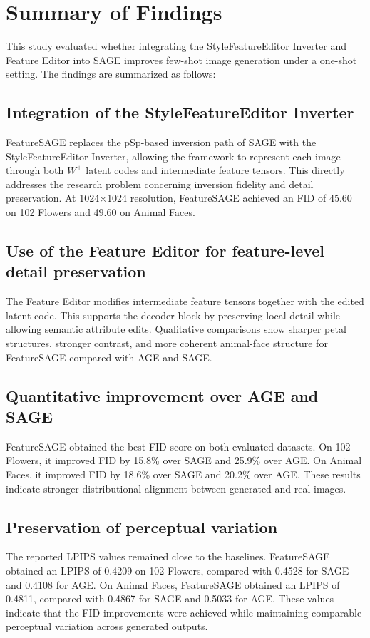 \section{Summary of Findings}

This study evaluated whether integrating the StyleFeatureEditor Inverter and Feature Editor into SAGE improves few-shot image generation under a one-shot setting. The findings are summarized as follows:

\subsection{Integration of the StyleFeatureEditor Inverter}

FeatureSAGE replaces the pSp-based inversion path of SAGE with the StyleFeatureEditor Inverter, allowing the framework to represent each image through both $W^{+}$ latent codes and intermediate feature tensors. This directly addresses the research problem concerning inversion fidelity and detail preservation. At 1024$\times$1024 resolution, FeatureSAGE achieved an FID of 45.60 on 102 Flowers and 49.60 on Animal Faces.

\subsection[Feature Editor for detail preservation]{Use of the Feature Editor for feature-level detail preservation}

The Feature Editor modifies intermediate feature tensors together with the edited latent code. This supports the decoder block by preserving local detail while allowing semantic attribute edits. Qualitative comparisons show sharper petal structures, stronger contrast, and more coherent animal-face structure for FeatureSAGE compared with AGE and SAGE.

\subsection{Quantitative improvement over AGE and SAGE}

FeatureSAGE obtained the best FID score on both evaluated datasets. On 102 Flowers, it improved FID by 15.8\% over SAGE and 25.9\% over AGE. On Animal Faces, it improved FID by 18.6\% over SAGE and 20.2\% over AGE. These results indicate stronger distributional alignment between generated and real images.

\subsection{Preservation of perceptual variation}

The reported LPIPS values remained close to the baselines. FeatureSAGE obtained an LPIPS of 0.4209 on 102 Flowers, compared with 0.4528 for SAGE and 0.4108 for AGE. On Animal Faces, FeatureSAGE obtained an LPIPS of 0.4811, compared with 0.4867 for SAGE and 0.5033 for AGE. These values indicate that the FID improvements were achieved while maintaining comparable perceptual variation across generated outputs.
